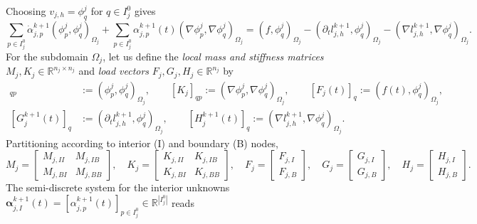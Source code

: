 \documentclass[a4paper, 11pt]{article}
\theoremstyle{remark}
\begin{document}
Choosing $v_{j, h} = \phi_{q}^{j}$ for $q\in I_{j}^{0}$ gives
\begin{equation*}
   \sum_{p\in I^{0}_{j}}\dot{\alpha}_{j, p}^{k+1}\left(\phi_{p}^{j}, \phi_{q}^{j}\right)_{\Omega_{j}} + \sum_{p\in I^{0}_{j}}\alpha_{j, p}^{k+1}(t)\left(\nabla\phi_{p}^{j}, \nabla \phi_{q}^{j}\right)_{\Omega_{j}} = \left(f, \phi_{q}^{j}\right)_{\Omega_{j}} - \left(\partial_{t} l_{j, h}^{k+1}, \phi_{q}^{j}\right)_{\Omega_{j}} - \left(\nabla l_{j, h}^{k+1}, \nabla \phi_{q}^{j}\right)_{\Omega_{j}}.
\end{equation*}
For the subdomain $\Omega_j$, let us define the \textit{local mass and stiffness matrices} $M_{j}, K_{j}\in \mathbb{R}^{n_{j}\times n_{j}}$ and \textit{load vectors} $F_{j}, G_{j}, H_{j}\in \mathbb{R}^{n_{j}}$ by
\begin{align*}
    [M_j]_{qp} &:= (\phi_{p}^{j}, \phi_{q}^{j})_{\Omega_j}, \qquad [K_j]_{qp} := (\nabla \phi_{p}^{j}, \nabla \phi_{q}^{j})_{\Omega_j}, \qquad [F_j(t)]_{q} := (f(t), \phi_{q}^{j})_{\Omega_j}, \\
    [G^{k+1}_j(t)]_q &:= (\partial_t l_{j, h}^{k+1}, \phi_{q}^{j})_{\Omega_j}, \qquad
    [H^{k+1}_j(t)]_q := (\nabla l_{j, h}^{k+1}, \nabla \phi_{q}^{j})_{\Omega_j}.
\end{align*}
Partitioning according to interior (I) and boundary (B) nodes,
\begin{equation*}
    M_{j} = 
    \begin{bmatrix}
        M_{j, II} & M_{j,IB}\\
        M_{j,BI} & M_{j,BB}
    \end{bmatrix}, \quad
    K_{j} = 
    \begin{bmatrix}
        K_{j,II} & K_{j,IB}\\
        K_{j, BI} & K_{j,BB}
    \end{bmatrix}, \quad
    F_{j} = 
    \begin{bmatrix}
        F_{j,I}\\
        F_{j,B}
    \end{bmatrix}, \quad
    G_{j} = 
    \begin{bmatrix}
        G_{j,I}\\
        G_{j,B}
    \end{bmatrix}, \quad
    H_{j} = 
    \begin{bmatrix}
        H_{j,I}\\
        H_{j,B}
    \end{bmatrix}.
\end{equation*}
The semi-discrete system for the interior unknowns $\boldsymbol{\alpha}_{j, I}^{k+1}(t) = [\alpha_{j, p}^{k+1}(t)]_{p\in I_{j}^{0}} \in \mathbb{R}^{|I_j^0|}$ reads
\end{document}
